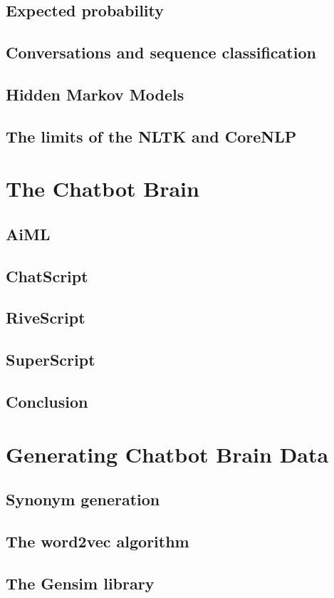 \documentclass[12pt, twoside, a4paper, draft]{report}
\begin{document}
\subsection{Expected probability}
\subsection{Conversations and sequence classification}
\subsection{Hidden Markov Models}
\subsection{The limits of the NLTK and CoreNLP}
\section{The Chatbot Brain}
\subsection{AiML}
\subsection{ChatScript}
\subsection{RiveScript}
\subsection{SuperScript}
\subsection{Conclusion}
\section{Generating Chatbot Brain Data}
\subsection{Synonym generation}
\subsection{The word2vec algorithm}
\subsection{The Gensim library}
\end{document}
